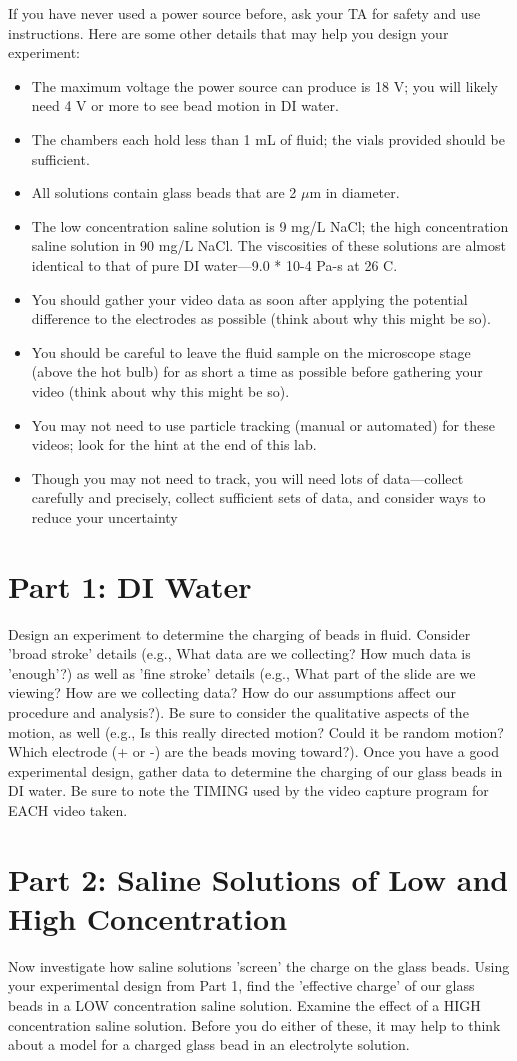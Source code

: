 If you have never used a power source before, ask your TA for safety and use instructions. Here are some other details that may help you design your experiment:
\begin{itemize}
\item The maximum voltage the power source can produce is 18 V; you will likely need 4 V or more to see bead motion in DI water.
\item The chambers each hold less than 1 mL of fluid; the vials provided should be sufficient.
\item All solutions contain glass beads that are 2 $\mu$m in diameter.
\item The low concentration saline solution is 9 mg/L NaCl; the high concentration saline
solution in 90 mg/L NaCl. The viscosities of these solutions are almost identical to that of
pure DI water—9.0 * 10-4 Pa-s at 26 C.
\item You should gather your video data as soon after applying the potential difference to the
electrodes as possible (think about why this might be so).
\item You should be careful to leave the fluid sample on the microscope stage (above the hot
bulb) for as short a time as possible before gathering your video (think about why this might
be so).
\item You may not need to use particle tracking (manual or automated) for these videos; look for
the hint at the end of this lab.
\item Though you may not need to track, you will need lots of data—collect carefully and
precisely, collect sufficient sets of data, and consider ways to reduce your uncertainty
\end{itemize}

\section*{Part 1: DI Water}
Design an experiment to determine the charging of beads in fluid. 
Consider 'broad stroke' details (e.g., What data are we collecting? How much data is 'enough'?) as well as 'fine stroke' details (e.g., What part of the slide are we viewing? How are we collecting data? How do our assumptions affect our procedure and analysis?). 
Be sure to consider the qualitative aspects of the motion, as well (e.g., Is this really directed motion? Could it be random motion? Which electrode (+ or -) are the beads moving toward?). 
Once you have a good experimental design, gather data to determine the charging of our glass beads in DI water. 
Be sure to note the TIMING used by the video capture program for EACH video taken.

\section*{Part 2: Saline Solutions of Low and High Concentration}
Now investigate how saline solutions 'screen' the charge on the glass beads. 
Using your experimental design from Part 1, find the 'effective charge' of our glass beads in a LOW concentration saline solution. 
Examine the effect of a HIGH concentration saline solution. 
Before you do either of these, it may help to think about a model for a charged glass bead in an electrolyte solution.